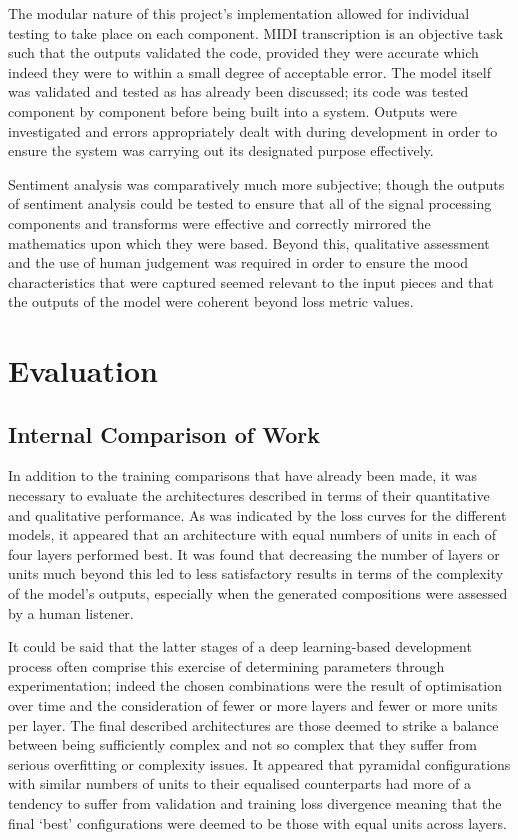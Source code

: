 \documentclass[12pt,]{article}
\begin{document}
The modular nature of this project's implementation allowed for
individual testing to take place on each component. MIDI transcription
is an objective task such that the outputs validated the code, provided
they were accurate which indeed they were to within a small degree of
acceptable error. The model itself was validated and tested as has
already been discussed; its code was tested component by component
before being built into a system. Outputs were investigated and errors
appropriately dealt with during development in order to ensure the
system was carrying out its designated purpose effectively.

Sentiment analysis was comparatively much more subjective; though the
outputs of sentiment analysis could be tested to ensure that all of the
signal processing components and transforms were effective and correctly
mirrored the mathematics upon which they were based. Beyond this,
qualitative assessment and the use of human judgement was required in
order to ensure the mood characteristics that were captured seemed
relevant to the input pieces and that the outputs of the model were
coherent beyond loss metric values.

\hypertarget{evaluation}{%
\section{Evaluation}\label{evaluation}}

\hypertarget{internal-comparison-of-work}{%
\subsection{Internal Comparison of
Work}\label{internal-comparison-of-work}}

In addition to the training comparisons that have already been made, it
was necessary to evaluate the architectures described in terms of their
quantitative and qualitative performance. As was indicated by the loss
curves for the different models, it appeared that an architecture with
equal numbers of units in each of four layers performed best. It was
found that decreasing the number of layers or units much beyond this led
to less satisfactory results in terms of the complexity of the model's
outputs, especially when the generated compositions were assessed by a
human listener.

It could be said that the latter stages of a deep learning-based
development process often comprise this exercise of determining
parameters through experimentation; indeed the chosen combinations were
the result of optimisation over time and the consideration of fewer or
more layers and fewer or more units per layer. The final described
architectures are those deemed to strike a balance between being
sufficiently complex and not so complex that they suffer from serious
overfitting or complexity issues. It appeared that pyramidal
configurations with similar numbers of units to their equalised
counterparts had more of a tendency to suffer from validation and
training loss divergence meaning that the final `best' configurations
were deemed to be those with equal units across layers.
\end{document}
